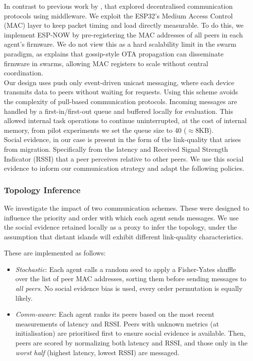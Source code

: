 \documentclass[conference]{IEEEtran}
\begin{document}
In contrast to previous work by \cite{rabbah_real_2021}, that explored decentralised communication protocols using middleware. We exploit the ESP32's Medium Access Control (MAC) layer to keep  packet timing and load directly measurable. To do this, we implement ESP-NOW by pre-registering the MAC addresses of all peers in each agent's firmware. We do not view this as a hard scalability limit in the swarm paradigm, as \cite{varadharajan_over--air_2018} explains that gossip-style OTA propagation can disseminate firmware in swarms, allowing MAC registers to scale without central coordination. \\

Our design uses push only event-driven unicast messaging, where each device transmits data to peers without waiting for requests. Using this scheme avoids the complexity of pull-based communication protocols. Incoming messages are handled by a first-in/first-out queue and buffered locally for evaluation. This allowed internal task operations to continue uninterrupted, at the cost of internal memory, from pilot experiments we set the queue size to 40 ($\approx$8KB). \\

Social evidence, in our case is present in the form of the link-quality that arises from migration. Specifically from the latency and Received Signal Strength Indicator (RSSI) that a peer perceives relative to other peers. We use this social evidence to inform our communication strategy and adapt the following policies. \\

\subsubsection{Topology Inference}\label{sec:topology-inference}

We investigate the impact of two communication schemes. These were designed to influence the priority and order with which each agent sends messages. We use the social evidence retained locally as a proxy to infer the topology, under the assumption that distant islands will exhibit different link-quality characteristics. 

These are implemented as follows:

\begin{itemize}
    \item \emph{Stochastic}: Each agent calls a random seed to apply a Fisher-Yates shuffle \cite{fisher_statistical_1963} over the list of peer MAC addresses, sorting them before sending messages to \emph{all peers}. No social evidence bias is used, every order permutation is equally likely.
    \item \emph{Comm-aware}: Each agent ranks its peers based on the most recent measurements of latency and RSSI. Peers with unknown metrics (at initialisation) are prioritised first to ensure social evidence is available. Then, peers are scored by normalizing both latency and RSSI, and those only in the \emph{worst half} (highest latency, lowest RSSI) are messaged. \\
\end{itemize}
\end{document}
